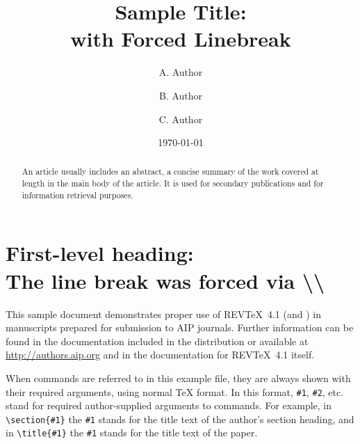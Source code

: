 \documentclass[%
 aip,
 amsmath,amssymb,
reprint, onecolumn %
]{revtex4-1}
\begin{document}

\title[Sample title]{Sample Title:\\with Forced Linebreak}
\author{A. Author}
\author{B. Author}%
%

\author{C. Author}
%

\date{\today}%

\begin{abstract}
An article usually includes an abstract, a concise summary of the work
covered at length in the main body of the article. It is used for
secondary publications and for information retrieval purposes. 
\end{abstract}

\maketitle

\section{\label{sec:level1}First-level heading:\protect\\ The line
break was forced \lowercase{via} \textbackslash\textbackslash}

This sample document demonstrates proper use of REV\TeX~4.1 (and
\LaTeXe) in manuscripts prepared for submission to AIP
journals. Further information can be found in the documentation included in the distribution or available at
\url{http://authors.aip.org} and in the documentation for 
REV\TeX~4.1 itself.

When commands are referred to in this example file, they are always
shown with their required arguments, using normal \TeX{} format. In
this format, \verb+#1+, \verb+#2+, etc. stand for required
author-supplied arguments to commands. For example, in
\verb+\section{#1}+ the \verb+#1+ stands for the title text of the
author's section heading, and in \verb+\title{#1}+ the \verb+#1+
stands for the title text of the paper.
\end{document}
